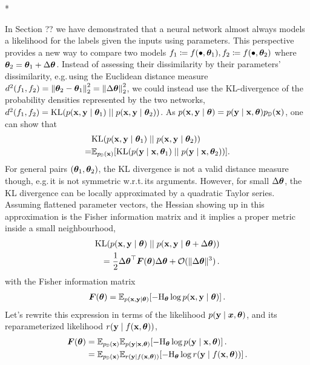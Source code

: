 \switchcolumn[1]*
\switchcolumn[0]

In Section ??
we have demonstrated that a neural network almost always models a likelihood for the labels given the inputs using parameters.
This perspective provides a new way to compare two models $f_1 \coloneq f(\bullet, {\bm{\theta}}_1), f_2 \coloneq f(\bullet, {\bm{\theta}}_{2})$ where ${\bm{\theta}}_2 = {\bm{\theta}}_1 + \Delta {\bm{\theta}}$.
Instead of assessing their dissimilarity by their parameters' dissimilarity, e.g.\,using the Euclidean distance measure $d^2(f_1, f_2) = \left\lVert {\bm{\theta}}_2 - {\bm{\theta}}_1 \right\rVert_2^2 = \left\lVert \Delta {\bm{\theta}} \right\rVert_2^2$, we could instead use the KL-divergence of the probability densities represented by the two networks, $d^2(f_1, f_2) = \mathrm{KL}(p({\mathbf{x}}, {\mathbf{y}} \mid {\bm{\theta}}_1) \mid\mid p({\mathbf{x}}, {\mathbf{y}} \mid {\bm{\theta}}_2))$.
As $p({\mathbf{x}}, {\mathbf{y}} \mid {\bm{\theta}}) = p({\mathbf{y}} \mid {\mathbf{x}}, {\bm{\theta}})p_{{\mathbb{D}}}({\mathbf{x}})$, one can show that
\begin{align*}
    & \mathrm{KL}(p({\mathbf{x}}, {\mathbf{y}} \mid {\bm{\theta}}_1) \mid\mid p({\mathbf{x}}, {\mathbf{y}} \mid {\bm{\theta}}_2))                               \\
  = & \mathbb{E}_{p_{{\mathbb{D}}}({\mathbf{x}})} [\mathrm{KL}(p({\mathbf{y}} \mid {\mathbf{x}}, {\bm{\theta}}_1) \mid\mid p({\mathbf{y}} \mid {\mathbf{x}}, {\bm{\theta}}_2))].
\end{align*}
For general pairs $({\bm{\theta}}_1, {\bm{\theta}}_2)$, the KL divergence is not a valid distance measure though, e.g.\,it is not symmetric w.r.t.\,its arguments.
However, for small $\Delta {\bm{\theta}}$, the KL divergence can be locally approximated by a quadratic Taylor series.
Assuming flattened parameter vectors, the Hessian showing up in this approximation is the Fisher information matrix and it implies a proper metric inside a small neighbourhood,
\begin{align*}
  \mathrm{KL}(p({\mathbf{x}}, {\mathbf{y}} \mid {\bm{\theta}}) \mid\mid p({\mathbf{x}}, {\mathbf{y}} \mid {\bm{\theta}} + \Delta {\bm{\theta}}))
  \\
  = \frac{1}{2} {\Delta {\bm{\theta}}}^{\top} {\bm{F}}({\bm{\theta}}) \Delta {\bm{\theta}} + {\mathcal{O}}( \Vert\Delta {\bm{\theta}}\Vert^3)\,.
\end{align*}
with the Fisher information matrix
\begin{align*}
  {\bm{F}}({\bm{\theta}}) = \mathbb{E}_{p({\mathbf{x}}, {\mathbf{y}} \mid {\bm{\theta}})} [-\mathrm{H}_{{\bm{\theta}}} \log p({\mathbf{x}}, {\mathbf{y}} \mid {\bm{\theta}})]\,.
\end{align*}
Let's rewrite this expression in terms of the likelihood $p({\mathbf{y}} \mid {\bm{x}}, {\bm{\theta}})$, and its reparameterized likelihood $r({\mathbf{y}} \mid f({\mathbf{x}}, {\bm{\theta}}))$,
\begin{align*}
  {\bm{F}}({\bm{\theta}})
   & =
  \mathbb{E}_{p_{{\mathbb{D}}}({\mathbf{x}})}\mathbb{E}_{p({\mathbf{y}} \mid {\mathbf{x}}, {\bm{\theta}})} [-\mathrm{H}_{{\bm{\theta}}} \log p({\mathbf{y}} \mid {\mathbf{x}}, {\bm{\theta}})]\,.
  \\
   & =
  \mathbb{E}_{p_{{\mathbb{D}}}({\mathbf{x}})}\mathbb{E}_{r({\mathbf{y}} \mid f({\mathbf{x}}, {\bm{\theta}}))} [-\mathrm{H}_{{\bm{\theta}}} \log r({\mathbf{y}} \mid f({\mathbf{x}}, {\bm{\theta}}))]\,.
\end{align*}
